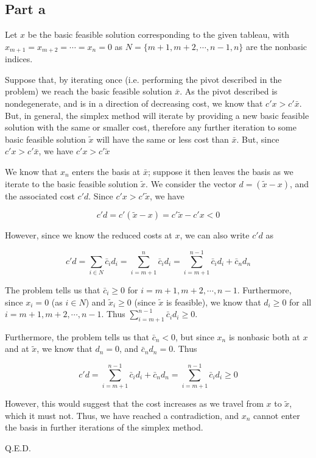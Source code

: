 \subsection*{Part a}

Let $x$ be the basic feasible solution corresponding to the given tableau, with $x_{m+1}=x_{m+2}=\cdots=x_n=0$ as $N=\{m+1, m+2, \cdots , n-1, n\}$ are the nonbasic indices. 

Suppose that, by iterating once (i.e. performing the pivot described in the problem) we reach the basic feasible solution $\bar{x}$. As the pivot described is nondegenerate, and is in a direction of decreasing cost, we know that $c'x>c'\bar{x}$. But, in general, the simplex method will iterate by providing a new basic feasible solution with the same or smaller cost, therefore any further iteration to some basic feasible solution $\tilde{x}$ will have the same or less cost than $\bar{x}$. But, since $c'x>c'\bar{x}$, we have $c'x>c'\tilde{x}$

We know that $x_n$ enters the basis at $\bar{x}$; suppose it then leaves the basis as we iterate to the basic feasible solution $\tilde{x}$. We consider the vector $d=(\tilde{x}-x)$, and the associated cost $c'd$. Since $c'x>c'\tilde{x}$, we have

$$
c'd=c'(\tilde{x}-x)=c'\tilde{x}-c'x<0
$$

However, since we know the reduced costs at $x$, we can also write $c'd$ as

$$
c'd=\sum_{i\in N}\bar{c}_id_i=\sum_{i=m+1}^n\bar{c}_id_i=\sum_{i=m+1}^{n-1}\bar{c}_id_i+\bar{c}_nd_n
$$

The problem tells us that $\bar{c}_i\geq 0$ for $i=m+1, m+2, \cdots, n-1$. Furthermore, since $x_i=0$ (as $i\in N$) and $\tilde{x}_i\geq 0$ (since $\tilde{x}$ is feasible), we know that $d_i\geq 0$ for all $i=m+1, m+2, \cdots, n-1$. Thus $\sum_{i=m+1}^{n-1}\bar{c}_id_i\geq 0$.

Furthermore, the problem tells us that $\bar{c}_n<0$, but since $x_n$ is nonbasic both at $x$ and at $\tilde{x}$, we know that $d_n=0$, and $\bar{c}_nd_n=0$. Thus

$$
c'd=\sum_{i=m+1}^{n-1}\bar{c}_id_i+\bar{c}_nd_n=\sum_{i=m+1}^{n-1}\bar{c}_id_i \geq 0
$$

However, this would suggest that the cost increases as we travel from $x$ to $\tilde{x}$, which it must not. Thus, we have reached a contradiction, and $x_n$ cannot enter the basis in further iterations of the simplex method.

Q.E.D.


